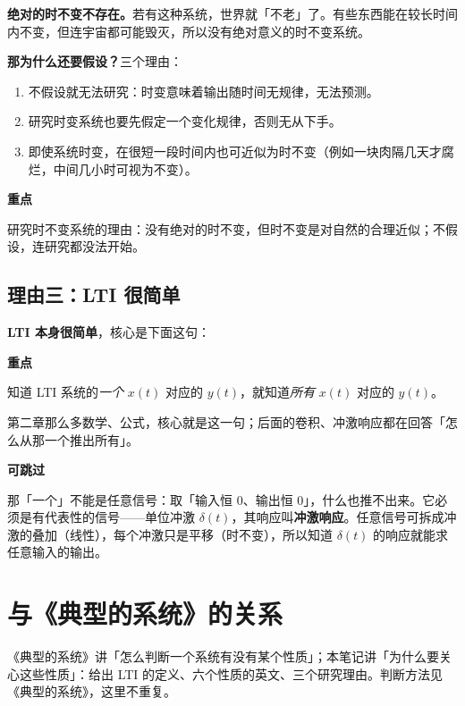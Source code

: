 \documentclass[UTF8,a4paper,11pt]{ctexart}
\newenvironment{remember}{\begin{rememberbox}\textbf{重点}\par\smallskip}{\end{rememberbox}}
\newenvironment{skippable}{\begin{skipbox}\textbf{可跳过}\par\smallskip}{\end{skipbox}}
\newcounter{ex}[section]
\begin{document}
\textbf{绝对的时不变不存在。}若有这种系统，世界就「不老」了。有些东西能在较长时间内不变，但连宇宙都可能毁灭，所以没有绝对意义的时不变系统。

\textbf{那为什么还要假设？}三个理由：
\begin{enumerate}[nosep]
\item 不假设就无法研究：时变意味着输出随时间无规律，无法预测。
\item 研究时变系统也要先假定一个变化规律，否则无从下手。
\item 即使系统时变，在很短一段时间内也可近似为时不变（例如一块肉隔几天才腐烂，中间几小时可视为不变）。
\end{enumerate}

\begin{remember}
研究时不变系统的理由：没有绝对的时不变，但时不变是对自然的合理近似；不假设，连研究都没法开始。
\end{remember}

\subsection{理由三：LTI 很简单}
\textbf{LTI 本身很简单}，核心是下面这句：
\begin{remember}
知道 LTI 系统的\emph{一个} $x(t)$ 对应的 $y(t)$，就知道\emph{所有} $x(t)$ 对应的 $y(t)$。
\end{remember}
第二章那么多数学、公式，核心就是这一句；后面的卷积、冲激响应都在回答「怎么从那一个推出所有」。

\begin{skippable}
那「一个」不能是任意信号：取「输入恒 $0$、输出恒 $0$」，什么也推不出来。它必须是有代表性的信号——单位冲激 $\delta(t)$，其响应叫\textbf{冲激响应}。任意信号可拆成冲激的叠加（线性），每个冲激只是平移（时不变），所以知道 $\delta(t)$ 的响应就能求任意输入的输出。
\end{skippable}

\needspace{6cm}
\section{与《典型的系统》的关系}
《典型的系统》讲「怎么判断一个系统有没有某个性质」；本笔记讲「为什么要关心这些性质」：给出 LTI 的定义、六个性质的英文、三个研究理由。判断方法见《典型的系统》，这里不重复。
\end{document}

